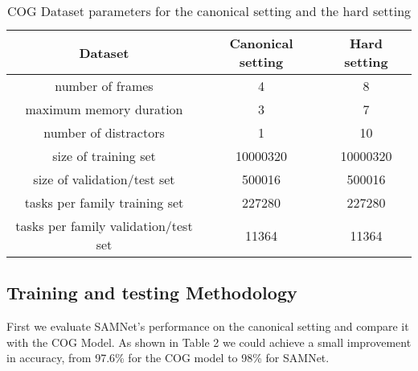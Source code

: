\begin{table}[!t]
	\centering
	\caption{COG Dataset parameters for the canonical setting and the hard setting  }
	\begin{tabular}{ccc}
		\toprule
		Dataset       &    Canonical setting   & Hard setting   \\
		
		\midrule
		
		number of frames      &    4  &  8      \\
		
		\midrule
		
		maximum memory duration      &    3   & 7      \\
		
		\midrule
		
		number of distractors     &    1   & 10    \\
		
		\midrule
		
		size of training set    &    10000320  & 10000320      \\
		
		\midrule
		
		size of validation/test set    &    500016   & 500016      \\
		
		\midrule
		
		tasks per family  training set   &    227280  & 227280    \\
		
		\midrule
		
		tasks per family  validation/test set   &    11364   & 11364      \\
		
	
	
		
	
	   \bottomrule
	
	\end{tabular}
	
	\label{tab:parameters}
\end{table}


\subsection{Training and testing Methodology}

First we evaluate SAMNet's performance on the canonical setting and compare it with the COG Model. As shown in Table 2 we could achieve a small improvement in accuracy, from 97.6\% for the COG model to 98\% for SAMNet.

